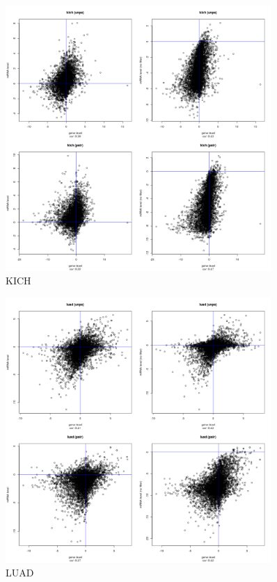 \documentclass[a4paper,12pt]{article}
\begin{document}
\newpage

\begin{figure}[!h] 
\centering 
\includegraphics[width=0.9\textwidth]{plots/gene_vs_mirna_level_gsa_kich.png} 
\caption{KICH} 
\end{figure} 

\newpage

\begin{figure}[!h] 
\centering 
\includegraphics[width=0.9\textwidth]{plots/gene_vs_mirna_level_gsa_luad.png} 
\caption{LUAD} 
\end{figure} 
\end{document}
